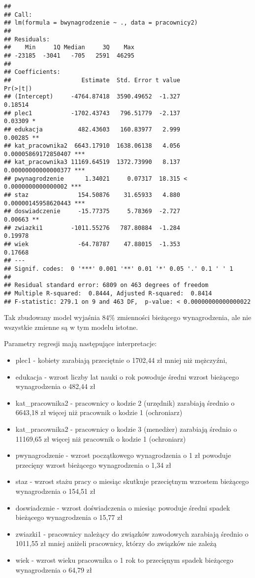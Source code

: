 \documentclass[]{book}
\providecommand{\tightlist}{%
  \setlength{\itemsep}{0pt}\setlength{\parskip}{0pt}}
\begin{document}
\begin{verbatim}
## 
## Call:
## lm(formula = bwynagrodzenie ~ ., data = pracownicy2)
## 
## Residuals:
##    Min     1Q Median     3Q    Max 
## -23185  -3041   -705   2591  46295 
## 
## Coefficients:
##                    Estimate  Std. Error t value             Pr(>|t|)    
## (Intercept)     -4764.87418  3590.49652  -1.327              0.18514    
## plec1           -1702.43743   796.51779  -2.137              0.03309 *  
## edukacja          482.43603   160.83977   2.999              0.00285 ** 
## kat_pracownika2  6643.17910  1638.06138   4.056  0.00005869172850407 ***
## kat_pracownika3 11169.64519  1372.73990   8.137  0.00000000000000377 ***
## pwynagrodzenie      1.34021     0.07317  18.315 < 0.0000000000000002 ***
## staz              154.50876    31.65933   4.880  0.00000145958620443 ***
## doswiadczenie     -15.77375     5.78369  -2.727              0.00663 ** 
## zwiazki1        -1011.55276   787.80884  -1.284              0.19978    
## wiek              -64.78787    47.88015  -1.353              0.17668    
## ---
## Signif. codes:  0 '***' 0.001 '**' 0.01 '*' 0.05 '.' 0.1 ' ' 1
## 
## Residual standard error: 6809 on 463 degrees of freedom
## Multiple R-squared:  0.8444, Adjusted R-squared:  0.8414 
## F-statistic: 279.1 on 9 and 463 DF,  p-value: < 0.00000000000000022
\end{verbatim}

Tak zbudowany model wyjaśnia 84\% zmienności bieżącego wynagrodzenia,
ale nie wszystkie zmienne są w tym modelu istotne.

Parametry regresji mają następujące interpretacje:

\begin{itemize}
\tightlist
\item
  plec1 - kobiety zarabiają przeciętnie o 1702,44 zł mniej niż
  mężczyźni,
\item
  edukacja - wzrost liczby lat nauki o rok powoduje średni wzrost
  bieżącego wynagrodzenia o 482,44 zł
\item
  kat\_pracownika2 - pracownicy o kodzie 2 (urzędnik) zarabiają średnio
  o 6643,18 zł więcej niż pracownik o kodzie 1 (ochroniarz)
\item
  kat\_pracownika2 - pracownicy o kodzie 3 (menedżer) zarabiają średnio
  o 11169,65 zł więcej niż pracownik o kodzie 1 (ochroniarz)
\item
  pwynagrodzenie - wzrost początkowego wynagrodzenia o 1 zł powoduje
  przecięny wzrost bieżącego wynagrodzenia o 1,34 zł
\item
  staz - wzrost stażu pracy o miesiąc skutkuje przeciętnym wzrostem
  bieżącego wynagrodzenia o 154,51 zł
\item
  doswiadcznie - wzrost doświadczenia o miesiąc powoduje średni spadek
  bieżącego wynagrodzenia o 15,77 zł
\item
  zwiazki1 - pracownicy należący do związków zawodowych zarabiają
  średnio o 1011,55 zł mniej aniżeli pracownicy, którzy do związków nie
  zależą
\item
  wiek - wzrost wieku pracownika o 1 rok to przecięnym spadek bieżącego
  wynagrodzenia o 64,79 zł
\end{itemize}
\end{document}
